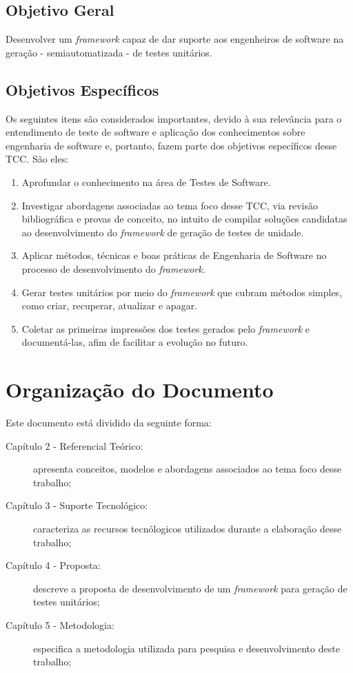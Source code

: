     \subsection{Objetivo Geral}
    Desenvolver um \textit{framework} capaz de dar suporte aos engenheiros de software na geração - semiautomatizada - de testes unitários.
    
    \subsection{Objetivos Específicos}
    Os seguintes itens são considerados importantes, devido à sua relevância para o entendimento de teste de software e aplicação dos conhecimentos sobre engenharia de software e, portanto, fazem parte dos objetivos específicos desse TCC. São eles:

    \begin{enumerate}
      \item Aprofundar o conhecimento na área de Testes de Software.
      
      \item Investigar abordagens associadas ao tema foco desse TCC, via revisão bibliográfica e provas de conceito, no intuito de compilar soluções candidatas ao desenvolvimento do \textit{framework} de geração de testes de unidade.
      
      \item Aplicar métodos, técnicas e boas práticas de Engenharia de Software no processo de desenvolvimento do \textit{framework}.
      
      \item Gerar testes unitários por meio do \textit{framework} que cubram métodos simples, como criar, recuperar, atualizar e apagar.

      \item Coletar as primeiras impressões dos testes gerados pelo \textit{framework} e documentá-las, afim de facilitar a evolução no futuro.

    \end{enumerate}
    
\section{Organização do Documento}
	Este documento está dividido da seguinte forma:
	
	\begin{description}
		\item[Capítulo 2 - Referencial Teórico:] apresenta conceitos, modelos e abordagens associados ao tema foco desse trabalho;
		\item[Capítulo 3 - Suporte Tecnológico:] caracteriza as recursos tecnólogicos utilizados durante a elaboração desse trabalho;
		\item[Capítulo 4 - Proposta:] descreve a proposta de desenvolvimento de um \textit{framework} para geração de testes unitários;
		\item[Capítulo 5 - Metodologia:] especifica a metodologia utilizada para pesquisa e desenvolvimento deste trabalho;
	\end{description}
